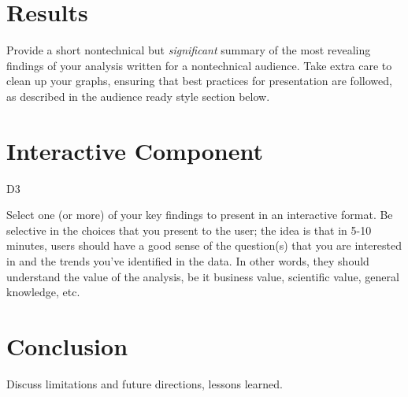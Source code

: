 \documentclass[]{book}
\begin{document}
\hypertarget{results}{%
\chapter{Results}\label{results}}

Provide a short nontechnical but \emph{significant} summary of the most revealing findings of your analysis written for a nontechnical audience. Take extra care to clean up your graphs, ensuring that best practices for presentation are followed, as described in the audience ready style section below.

\hypertarget{interactive-component}{%
\chapter{Interactive Component}\label{interactive-component}}

D3

Select one (or more) of your key findings to present in an interactive format. Be selective in the choices that you present to the user; the idea is that in 5-10 minutes, users should have a good sense of the question(s) that you are interested in and the trends you've identified in the data. In other words, they should understand the value of the analysis, be it business value, scientific value, general knowledge, etc.

\hypertarget{conclusion}{%
\chapter{Conclusion}\label{conclusion}}

Discuss limitations and future directions, lessons learned.


\end{document}
